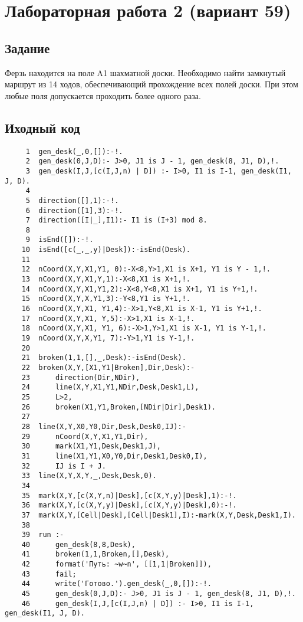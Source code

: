 \section{Лабораторная работа 2 (вариант 59)}
\subsection{Задание}


Ферзь находится на поле A1 шахматной доски. Необходимо найти замкнутый маршрут из 14 ходов, обеспечивающий прохождение всех полей доски. При этом любые поля допускается проходить более одного раза.

\subsection{Иходный код}
\begin{verbatim}
     1	gen_desk(_,0,[]):-!.
     2	gen_desk(0,J,D):- J>0, J1 is J - 1, gen_desk(8, J1, D),!.
     3	gen_desk(I,J,[c(I,J,n) | D]) :- I>0, I1 is I-1, gen_desk(I1, J, D). 
     4	
     5	direction([],1):-!.
     6	direction([1],3):-!.
     7	direction([I|_],I1):- I1 is (I+3) mod 8.
     8	
     9	isEnd([]):-!.
    10	isEnd([c(_,_,y)|Desk]):-isEnd(Desk).
    11	
    12	nCoord(X,Y,X1,Y1, 0):-X<8,Y>1,X1 is X+1, Y1 is Y - 1,!.
    13	nCoord(X,Y,X1,Y,1):-X<8,X1 is X+1,!.
    14	nCoord(X,Y,X1,Y1,2):-X<8,Y<8,X1 is X+1, Y1 is Y+1,!.
    15	nCoord(X,Y,X,Y1,3):-Y<8,Y1 is Y+1,!.
    16	nCoord(X,Y,X1, Y1,4):-X>1,Y<8,X1 is X-1, Y1 is Y+1,!.
    17	nCoord(X,Y,X1, Y,5):-X>1,X1 is X-1,!.
    18	nCoord(X,Y,X1, Y1, 6):-X>1,Y>1,X1 is X-1, Y1 is Y-1,!.
    19	nCoord(X,Y,X,Y1, 7):-Y>1,Y1 is Y-1,!.
    20	
    21	broken(1,1,[],_,Desk):-isEnd(Desk).
    22	broken(X,Y,[X1,Y1|Broken],Dir,Desk):-
    23	    direction(Dir,NDir),
    24	    line(X,Y,X1,Y1,NDir,Desk,Desk1,L),
    25		L>2,
    26		broken(X1,Y1,Broken,[NDir|Dir],Desk1).
    27	
    28	line(X,Y,X0,Y0,Dir,Desk,Desk0,IJ):-
    29		nCoord(X,Y,X1,Y1,Dir),
    30	    mark(X1,Y1,Desk,Desk1,J),
    31	    line(X1,Y1,X0,Y0,Dir,Desk1,Desk0,I),
    32		IJ is I + J.
    33	line(X,Y,X,Y,_,Desk,Desk,0).
    34	
    35	mark(X,Y,[c(X,Y,n)|Desk],[c(X,Y,y)|Desk],1):-!.
    36	mark(X,Y,[c(X,Y,y)|Desk],[c(X,Y,y)|Desk],0):-!.
    37	mark(X,Y,[Cell|Desk],[Cell|Desk1],I):-mark(X,Y,Desk,Desk1,I).
    38	
    39	run :-
    40		gen_desk(8,8,Desk),
    41		broken(1,1,Broken,[],Desk),
    42		format('Путь: ~w~n', [[1,1|Broken]]),
    43		fail;
    44		write('Готово.').gen_desk(_,0,[]):-!.
    45		gen_desk(0,J,D):- J>0, J1 is J - 1, gen_desk(8, J1, D),!.
    46		gen_desk(I,J,[c(I,J,n) | D]) :- I>0, I1 is I-1, gen_desk(I1, J, D). 
\end{verbatim}
